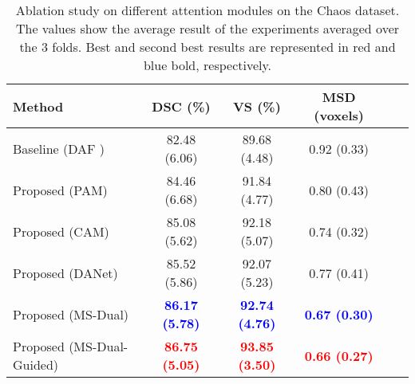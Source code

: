 \documentclass[journal]{IEEEtran}
\begin{document}
\begin{table}[ht!]
\centering
\scriptsize
\begin{tabular}{lcccc|c}\\
\toprule
Method & \textbf{DSC (\%)} & \textbf{VS (\%)} & \textbf{MSD (voxels)}  \\
\midrule
Baseline (DAF \cite{wang18d})  &  82.48 (6.06) &   89.68 (4.48) &  0.92 (0.33)
\\
Proposed (PAM)  & 84.46 (6.68) &  91.84 (4.77) &  0.80 (0.43) \\
Proposed (CAM)  & 85.08 (5.62) & 92.18 (5.07) & 0.74 (0.32)\\
Proposed (DANet) &  85.52 (5.86) &  92.07 (5.23) &   0.77 (0.41)      \\
Proposed (MS-Dual) &  \textcolor{blue}{\textbf{86.17 (5.78)}} & \textcolor{blue}{\textbf{92.74 (4.76)}} &  \textcolor{blue}{\textbf{0.67 (0.30)}}\\
Proposed (MS-Dual-Guided)  &  \textcolor{red}{\textbf{86.75 (5.05)}} & \textcolor{red}{\textbf{93.85 (3.50)}} &  \textcolor{red}{\textbf{0.66 (0.27)}}\\

\midrule
\end{tabular}
\caption{Ablation study on different attention modules on the Chaos dataset. The values show the average result of the experiments averaged over the 3 folds. Best and second best results are represented in red and blue bold, respectively.}
\label{table:metrics_ablation}
\end{table}
\end{document}
